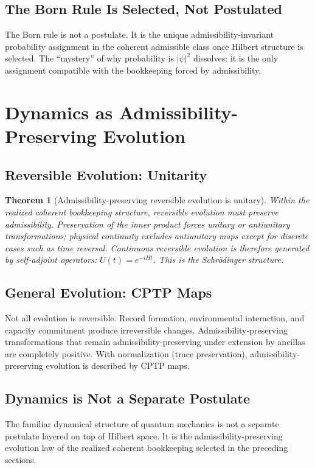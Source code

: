 \documentclass[11pt]{article}
\newtheorem{theorem}{Theorem}[section]
\begin{document}
\subsection{The Born Rule Is Selected, Not Postulated}
The Born rule is not a postulate. It is the unique admissibility-invariant
probability assignment in the coherent admissible class once Hilbert structure is
selected. The ``mystery'' of why probability is $\lvert\psi\rvert^2$ dissolves: it
is the only assignment compatible with the bookkeeping forced by admissibility.

\section{Dynamics as Admissibility-Preserving Evolution}\label{sec:dynamics}

\subsection{Reversible Evolution: Unitarity}
\begin{theorem}[Admissibility-preserving reversible evolution is unitary]
Within the realized coherent bookkeeping structure, reversible evolution must
preserve admissibility. Preservation of the inner product forces unitary or
antiunitary transformations; physical continuity excludes antiunitary maps except
for discrete cases such as time reversal. Continuous reversible evolution is
therefore generated by self-adjoint operators: $U(t) = e^{-iHt}$. This is the
Schr\"odinger structure.
\end{theorem}

\subsection{General Evolution: CPTP Maps}
Not all evolution is reversible. Record formation, environmental interaction, and
capacity commitment produce irreversible changes. Admissibility-preserving
transformations that remain admissibility-preserving under extension by ancillas
are completely positive. With normalization (trace preservation),
admissibility-preserving evolution is described by CPTP maps.

\subsection{Dynamics is Not a Separate Postulate}
The familiar dynamical structure of quantum mechanics is not a separate postulate
layered on top of Hilbert space. It is the admissibility-preserving evolution law
of the realized coherent bookkeeping selected in the preceding sections.
\end{document}
